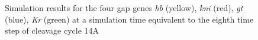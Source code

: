 \documentclass[12pt,a4paper,twoside,openright]{book}
\begin{document}
\begin{figure}
\caption[Simulation results for the Drosophila development]{Simulation results for the four gap genes \emph{hb} (yellow), \emph{kni} (red), \emph{gt} (blue), \emph{Kr} (green) at a simulation time equivalent to the eighth time step of cleavage cycle 14A}
\label{fig:simres}
\end{figure}
\end{document}
